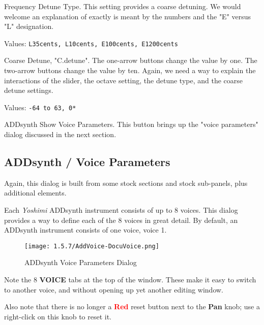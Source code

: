    Frequency Detune Type.
   This setting provides a coarse detuning.
   We would welcome an explanation of exactly is meant by the numbers and
   the "E" versus "L" designation.

   Values: \texttt{L35cents, L10cents, E100cents, E1200cents}

   Coarse Detune, "C.detune".
   The one-arrow buttons change the value by one.
   The two-arrow buttons change the value by ten.
   Again, we need a way to explain the interactions of the slider, the
   octave setting, the detune type, and the coarse detune settings.

   Values: \texttt{-64 to 63, 0*}

   ADDsynth Show Voice Parameters.
   This button brings up the "voice parameters" dialog discussed in the next
   section.

\subsection{ADDsynth / Voice Parameters}
\label{subsec:addsynth_voice_parameters}

   Again, this dialog is built from some stock sections and stock
   sub-panels, plus additional elements.

   Each \textsl{Yoshimi} ADDsynth instrument consists of up to 8 voices.
   This dialog provides a way to define each of the 8 voices in great
   detail.  By default, an ADDsynth instrument consists of one voice, voice 1.

\begin{figure}[H]
   \centering 
   \texttt{[image: 1.5.7/AddVoice-DocuVoice.png]}
   \caption{ADDsynth Voice Parameters Dialog}
   \label{fig:addsynth_voice_parameters_dialog}
\end{figure}

   Note the 8 \textbf{VOICE} tabs at the top of the window.
   These make it easy to switch to another voice, and without opening up yet
   another editing window.

   Also note that there is no longer a \textbf{\textcolor{red}{Red}}
   reset button next to the \textbf{Pan} knob;
   use a right-click on this knob to reset it.

